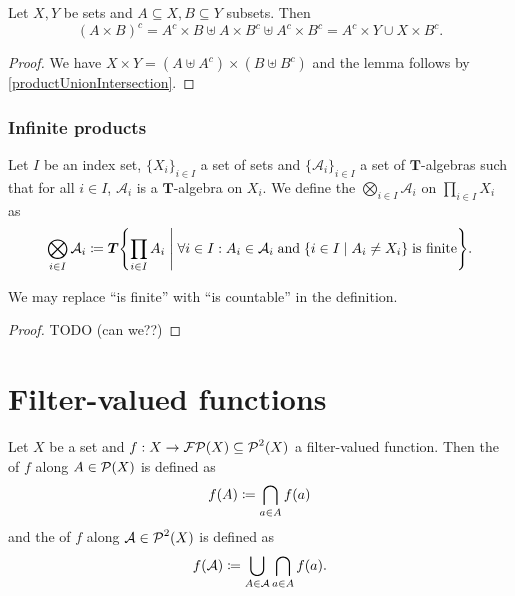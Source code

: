 \begin{lemma}
Let $X,Y$ be sets and $A\subseteq X, B\subseteq Y$ subsets. Then
\[ (A\times B)^c = A^c\times B \uplus A\times B^c \uplus A^c\times B^c = A^c\times Y \cup X\times B^c. \]
\end{lemma}
\begin{proof}
We have $X\times Y = (A\uplus A^c)\times (B\uplus B^c)$ and the lemma follows by \ref{productUnionIntersection}.
\end{proof}

\subsubsection{Infinite products}
\begin{definition}
Let $I$ be an index set, $\{X_i\}_{i\in I}$ a set of sets and $\{\mathcal{A}_i\}_{i\in I}$ a set of $\boldsymbol{T}$-algebras such that for all $i\in I$, $\mathcal{A}_i$ is a $\boldsymbol{T}$-algebra on $X_i$. We define the  $\bigotimes_{i\in I}\mathcal{A}_i$ on $\prod_{i\in I}X_i$ as
\[ \bigotimes_{i\in I}\mathcal{A}_i \defeq \boldsymbol{T}\setbuilder{\prod_{i\in I}A_i}{\forall i\in I: A_i\in\mathcal{A}_i\; \text{and}\; \setbuilder{i\in I}{A_i\neq X_i}\;\text{is finite}}. \]
\end{definition}

\begin{proposition}
We may replace ``is finite'' with ``is countable'' in the definition.
\end{proposition}
\begin{proof}
TODO (can we??)
\end{proof}

\section{Filter-valued functions}
\begin{definition}
Let $X$ be a set and $f: X\to \operatorname{\mathcal{FP}}(X) \subseteq \operatorname{\mathcal{P}}^2(X)$ a filter-valued function. Then the  of $f$ along $A\in \operatorname{\mathcal{P}}(X)$ is defined as
\[ f(A) \coloneqq \bigcap_{a\in A} f(a) \]
and the  of $f$ along $\mathcal{A}\in\operatorname{\mathcal{P}}^2(X)$ is defined as
\[ f(\mathcal{A}) \coloneqq \bigcup_{A\in\mathcal{A}}\bigcap_{a\in A} f(a). \]
\end{definition}

